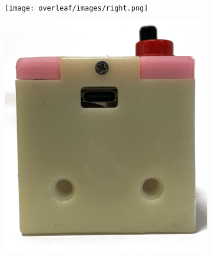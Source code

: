 \begin{figure}[H]
\begin{subfigure}[b]{0.25\textwidth}
    \end{subfigure}
    \\\vspace{2pt}
    \begin{subfigure}[b]{0.25\textwidth}
        \texttt{[image: overleaf/images/right.png]}
    \end{subfigure}
    \begin{subfigure}[b]{0.25\textwidth}
        \includegraphics[width=\linewidth]{overleaf/images/bottom.png}
    \end{subfigure}
    \begin{subfigure}[b]{0.25\textwidth}

\end{subfigure}
\end{figure}
